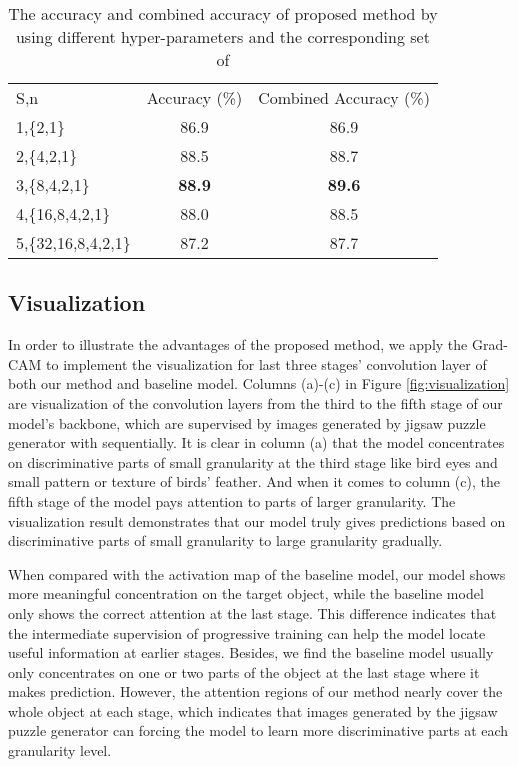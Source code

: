 \documentclass{llncs}
\begin{document}
\setlength{\tabcolsep}{4pt}
\begin{table}[!t]
\begin{center}
\caption{The accuracy and combined accuracy of proposed method by using different hyper-parameters  and the corresponding set of }
\label{table:5stage_wJPG}
\begin{tabular}{lcc}
\hline\noalign{\smallskip}
S,n & Accuracy (\%) & Combined Accuracy (\%)\\
\noalign{\smallskip}
\hline
\noalign{\smallskip}
1,\{2,1\} & 86.9 & 86.9\\
2,\{4,2,1\} & 88.5 & 88.7\\
3,\{8,4,2,1\} & {\bf 88.9} & {\bf 89.6}\\
4,\{16,8,4,2,1\} & 88.0 & 88.5\\
5,\{32,16,8,4,2,1\} & 87.2 & 87.7\\
\hline
\end{tabular}
\end{center}
\end{table}
\setlength{\tabcolsep}{1.4pt}



\subsection{Visualization}\label{ssec:visualization}

In order to illustrate the advantages of the proposed method, we apply the Grad-CAM to implement the visualization for last three stages' convolution layer of both our method and baseline model. Columns (a)-(c) in Figure \ref{fig:visualization} are visualization of the convolution layers from the third to the fifth stage of our model's backbone, which are supervised by images generated by jigsaw puzzle generator with  sequentially. It is clear in column (a) that the model concentrates on discriminative parts of small granularity at the third stage like bird eyes and small pattern or texture of birds' feather. And when it comes to column (c), the fifth stage of the model pays attention to parts of larger granularity. The visualization result demonstrates that our model truly gives predictions based on discriminative parts of small granularity to large granularity gradually.

When compared with the activation map of the baseline model, our model shows more meaningful concentration on the target object, while the baseline model only shows the correct attention at the last stage. This difference indicates that the intermediate supervision of progressive training can help the model locate useful information at earlier stages. Besides, we find the baseline model usually only concentrates on one or two parts of the object at the last stage where it makes prediction. However, the attention regions of our method nearly cover the whole object at each stage, which indicates that images generated by the jigsaw puzzle generator can forcing the model to learn more discriminative parts at each granularity level.
\end{document}
